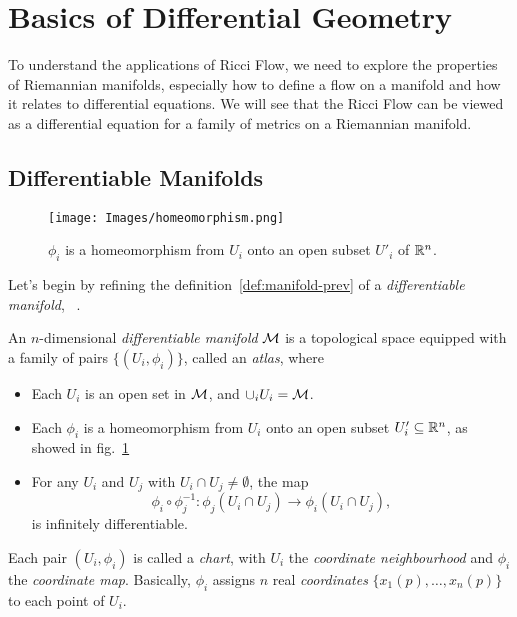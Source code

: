 \section{Basics of Differential Geometry}
To understand the applications of Ricci Flow, we need to explore the properties of Riemannian manifolds, especially how to define a flow on a manifold and how it relates to differential equations. We will see that the Ricci Flow can be viewed as a differential equation for a family of metrics on a Riemannian manifold.


\subsection{Differentiable Manifolds}
\begin{figure}
	\centering
	\texttt{[image: Images/homeomorphism.png]}
	\caption{$\phi_i$ is a homeomorphism from $U_i$ onto an open subset $U'_i$ of $\mathbb{R}^n$.}
	\label{fig:homeomorphism}
\end{figure}

Let's begin by refining the definition~\ref{def:manifold-prev} of a \emph{differentiable manifold}, ~\cite{lee:smooth,tu:manifolds}.

\begin{definition}
	An $n$-dimensional \emph{differentiable manifold} $\mathcal{M}$ is a topological space equipped with a family of pairs $\{ (U_i, \phi_i) \}$, called an \emph{atlas}, where
	\begin{itemize}
		\item Each $U_i$ is an open set in $\mathcal{M}$, and $\cup_i U_i = \mathcal{M}$.
		\item Each $\phi_i$ is a homeomorphism from $U_i$ onto an open subset $U_i'\subseteq \mathbb{R}^n$, as showed in fig.~\ref{fig:homeomorphism}
		\item For any $U_i$ and $U_j$ with $U_i \cap U_j \neq \emptyset$, the map
		      \begin{equation*}
			      \phi_i \circ \phi_j^{-1} \colon \phi_j (U_i \cap U_j) \to \phi_i(U_i \cap U_j),
		      \end{equation*}
		      is infinitely differentiable.
	\end{itemize}
\end{definition}

Each pair $(U_i, \phi_i)$ is called a \emph{chart}, with $U_i$ the \emph{coordinate neighbourhood} and $\phi_i$ the \emph{coordinate map}. Basically, $\phi_i$ assigns $n$ real \emph{coordinates} $\{x_1(p), \dots, x_n(p)\}$ to each point of $U_i$.

